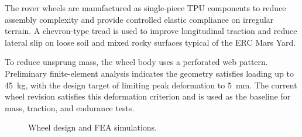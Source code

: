 
The rover wheels are manufactured as single-piece TPU components to reduce assembly 
complexity and provide controlled elastic compliance on irregular terrain. A chevron-type 
tread is used to improve longitudinal traction and reduce lateral slip on loose soil and 
mixed rocky surfaces typical of the ERC Mars Yard.

To reduce unsprung mass, the wheel body uses a perforated web pattern. Preliminary 
finite-element analysis indicates the geometry satisfies loading up to \SI{45}{\kilo\gram}, 
with the design target of limiting peak deformation to \SI{5}{\milli\metre}. The current 
wheel revision satisfies this deformation criterion and is used as the baseline for mass, 
traction, and endurance tests.

\begin{figure}[H]
\centering
\begin{minipage}[t]{0.48\linewidth}
	\centering
\end{minipage}\hfill
\begin{minipage}[t]{0.48\linewidth}
	\centering
\end{minipage}
\caption{Wheel design and FEA simulations.}
\label{fig:wheel_and_fea_placeholders}
\end{figure}

